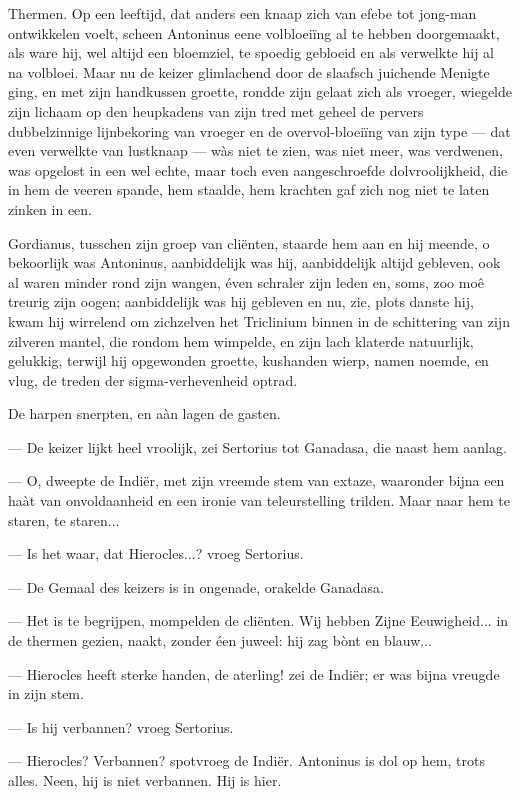 \documentclass[a4paper, 12pt, oneside, dutch]{article}
\begin{document}
Thermen. Op een leeftijd, dat anders een knaap zich van efebe tot jong-man ontwikkelen voelt, scheen Antoninus eene volbloeiïng al te hebben doorgemaakt, als ware hij, wel altijd een bloemziel, te spoedig gebloeid en als verwelkte hij al na volbloei. Maar nu de keizer glimlachend door de slaafsch juichende Menigte ging, en met zijn handkussen groette, rondde zijn gelaat zich als vroeger, wiegelde zijn lichaam op den heupkadens van zijn tred met geheel de pervers dubbelzinnige lijnbekoring van vroeger en de overvol-bloeiïng van zijn type --- dat even verwelkte van lustknaap --- wàs niet te zien, was niet meer, was verdwenen, was opgelost in een wel echte, maar toch even aangeschroefde dolvroolijkheid, die in hem de veeren spande, hem staalde, hem krachten gaf zich nog niet te laten zinken in een.

Gordianus, tusschen zijn groep van cliënten, staarde hem aan en hij meende, o bekoorlijk was Antoninus, aanbiddelijk was hij, aanbiddelijk altijd gebleven, ook al waren minder rond zijn wangen, éven schraler zijn leden en, soms, zoo moê treurig zijn oogen; aanbiddelijk was hij gebleven en nu, zie, plots danste hij, kwam hij wirrelend om zichzelven het Triclinium binnen in de schittering van zijn zilveren mantel, die rondom hem wimpelde, en zijn lach klaterde natuurlijk, gelukkig, terwijl hij opgewonden groette, kushanden wierp, namen noemde, en vlug, de treden der sigma-verhevenheid optrad.

De harpen snerpten, en aàn lagen de gasten.

--- De keizer lijkt heel vroolijk, zei Sertorius tot Ganadasa, die naast hem aanlag.

--- O, dweepte de Indiër, met zijn vreemde stem van extaze, waaronder bijna een haàt van onvoldaanheid en een ironie van teleurstelling trilden. Maar naar hem te staren, te staren...

--- Is het waar, dat Hierocles...? vroeg Sertorius.

--- De Gemaal des keizers is in ongenade, orakelde Ganadasa.

--- Het is te begrijpen, mompelden de cliënten. Wij hebben Zijne Eeuwigheid... in de thermen gezien, naakt, zonder éen juweel: hij zag bònt en blauw...

--- Hierocles heeft sterke handen, de aterling! zei de Indiër; er was bijna vreugde in zijn stem.

--- Is hij verbannen? vroeg Sertorius.

--- Hierocles? Verbannen? spotvroeg de Indiër. Antoninus is dol op hem, trots alles. Neen, hij is niet verbannen. Hij is hier.
\end{document}
